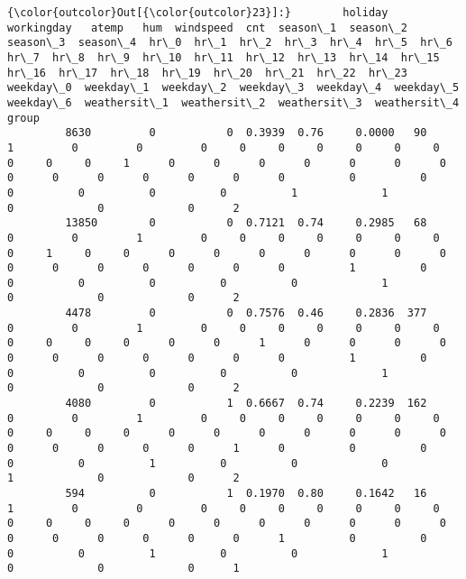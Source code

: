 \documentclass[11pt]{article}
\begin{document}
\begin{Verbatim}[commandchars=\\\{\}]
{\color{outcolor}Out[{\color{outcolor}23}]:}        holiday  workingday   atemp   hum  windspeed  cnt  season\_1  season\_2  season\_3  season\_4  hr\_0  hr\_1  hr\_2  hr\_3  hr\_4  hr\_5  hr\_6  hr\_7  hr\_8  hr\_9  hr\_10  hr\_11  hr\_12  hr\_13  hr\_14  hr\_15  hr\_16  hr\_17  hr\_18  hr\_19  hr\_20  hr\_21  hr\_22  hr\_23  weekday\_0  weekday\_1  weekday\_2  weekday\_3  weekday\_4  weekday\_5  weekday\_6  weathersit\_1  weathersit\_2  weathersit\_3  weathersit\_4  group
         8630         0           0  0.3939  0.76     0.0000   90         1         0         0         0     0     0     0     0     0     0     0     0     0     1      0      0      0      0      0      0      0      0      0      0      0      0      0      0          0          0          0          0          0          0          1             1             0             0             0      2
         13850        0           0  0.7121  0.74     0.2985   68         0         0         1         0     0     0     0     0     0     0     0     1     0     0      0      0      0      0      0      0      0      0      0      0      0      0      0      0          1          0          0          0          0          0          0             1             0             0             0      2
         4478         0           0  0.7576  0.46     0.2836  377         0         0         1         0     0     0     0     0     0     0     0     0     0     0      0      0      1      0      0      0      0      0      0      0      0      0      0      0          1          0          0          0          0          0          0             1             0             0             0      2
         4080         0           1  0.6667  0.74     0.2239  162         0         0         1         0     0     0     0     0     0     0     0     0     0     0      0      0      0      0      0      0      0      0      0      0      0      0      1      0          0          0          0          0          1          0          0             0             1             0             0      2
         594          0           1  0.1970  0.80     0.1642   16         1         0         0         0     0     0     0     0     0     0     0     0     0     0      0      0      0      0      0      0      0      0      0      0      0      0      0      1          0          0          0          0          1          0          0             1             0             0             0      1
\end{Verbatim}
            
\end{document}
